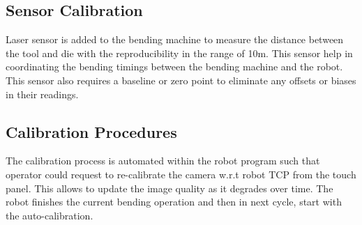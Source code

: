 \subsection{Sensor Calibration}
Laser sensor is added to the bending machine to measure the distance between the tool and die with the reproducibility in the range of 10\textmu m. This sensor help in coordinating the bending timings between the bending machine and the robot. This sensor also requires a baseline or zero point to eliminate any offsets or biases in their readings.

\subsection{Calibration Procedures}

The calibration process is automated within the robot program
such that operator could request to re-calibrate the camera w.r.t
robot TCP from the touch panel. This allows to update the image quality as it degrades over time. 
The robot finishes the current
bending operation and then in next cycle, start with the auto-calibration.

